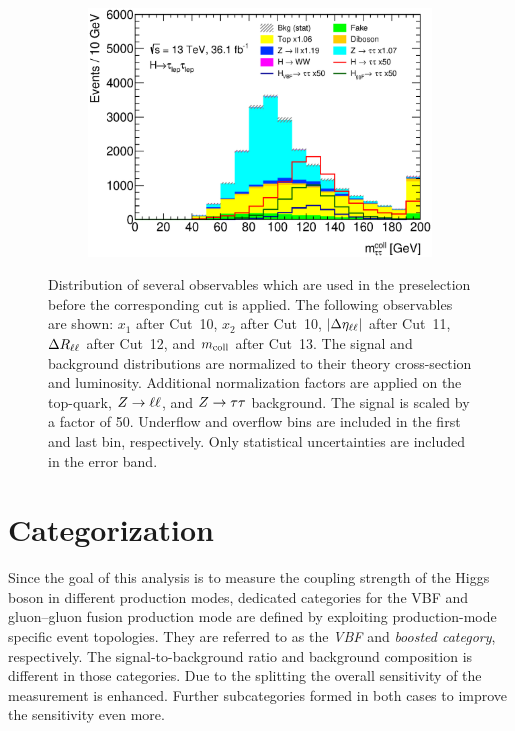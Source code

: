 \begin{figure}[htb]
\begin{subfigure}[t]{0.45\textwidth}
        \includegraphics[width=\textwidth]{./plots/event_selection/presel/ll-CutDRLL-mcoll-lin.eps}
        \caption{}\label{fig:event_selection:cutflow:mcoll}
    \end{subfigure}
    \caption{Distribution of several observables which are used in the preselection before the corresponding cut is applied.
             The following observables are shown: $x_1$ after Cut~10, $x_2$ after Cut~10, $\left|\Delta \eta_{\ell\ell}\right|$ after Cut~11, $\Delta R_{\ell\ell}$ after Cut~12, and $m_\text{coll}$ after Cut~13.
             The signal and background distributions are normalized to their theory cross-section and luminosity.
             Additional normalization factors are applied on the top-quark, $Z \to \ell \ell$, and $Z \to \tau \tau$ background.
             The signal is scaled by a factor of 50.
             Underflow and overflow bins are included in the first and last bin, respectively.
             Only statistical uncertainties are included in the error band.}\label{fig:event_selection:cutflow:2}
\end{figure}


\section{Categorization}\label{sec:event_selection:categorization}

Since the goal of this analysis is to measure the coupling strength of the Higgs boson
in different production modes, dedicated categories for the VBF and gluon--gluon fusion production mode
are defined by exploiting production-mode specific event topologies.
They are referred to as the \emph{VBF} and \emph{boosted category}, respectively.
The signal-to-background ratio and background composition is different in those categories.
Due to the splitting the overall sensitivity of the measurement is enhanced.
Further subcategories formed in both cases to improve the sensitivity even more.

